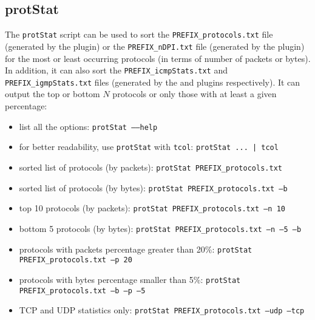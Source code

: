 \documentclass[documentation]{subfiles}
\begin{document}

\subsection{protStat}\label{protStat}
The {\tt protStat} script can be used to sort the {\tt PREFIX\_protocols.txt} file (generated by the  plugin) or the {\tt PREFIX\_nDPI.txt} file (generated by the  plugin) for the most or least occurring protocols (in terms of number of packets or bytes).
In addition, it can also sort the {\tt PREFIX\_icmpStats.txt} and {\tt PREFIX\_igmpStats.txt} files (generated by the  and  plugins respectively).
It can output the top or bottom $N$ protocols or only those with at least a given percentage:
\begin{itemize}
    \item list all the options: {\tt protStat --{}--help}
    \item for better readability, use {\tt protStat} with {\tt tcol}: {\tt protStat ... | tcol}
    \item sorted list of protocols (by packets): {\tt protStat PREFIX\_protocols.txt}
    \item sorted list of protocols (by bytes): {\tt protStat PREFIX\_protocols.txt --b}
    \item top 10 protocols (by packets): {\tt protStat PREFIX\_protocols.txt --n 10}
    \item bottom 5 protocols (by bytes): {\tt protStat PREFIX\_protocols.txt --n --5 --b}
    \item protocols with packets percentage greater than 20\%: {\tt protStat PREFIX\_protocols.txt --p 20}
    \item protocols with bytes percentage smaller than 5\%: {\tt protStat PREFIX\_protocols.txt --b --p --5}
    \item TCP and UDP statistics only: {\tt protStat PREFIX\_protocols.txt --udp --tcp}
\end{itemize}

\end{document}
